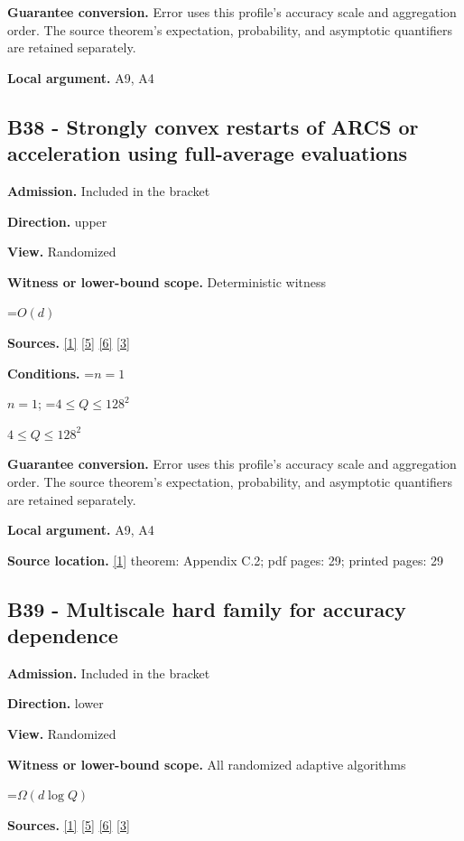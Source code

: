 \documentclass[10pt,a4paper]{article}
\newcommand{\AtlasMath}[1]{\par\begingroup\centering\setbox0=\hbox{$\displaystyle #1$}\ifdim\wd0>1.4\linewidth\typeout{ATLAS WIDE FORMULA: \the\wd0}\fi\ifdim\wd0>\linewidth\resizebox{\linewidth}{!}{\box0}\else\box0\fi\par\endgroup}
\newcommand{\AtlasInlineMath}[1]{\begingroup\setbox0=\hbox{$#1$}\ifdim\wd0>.4\linewidth\endgroup\AtlasMath{#1}\else\endgroup$#1$\fi}
\begin{document}
\textbf{Guarantee conversion.} Error uses this profile's accuracy scale and aggregation order. The source theorem's expectation, probability, and asymptotic quantifiers are retained separately.

\textbf{Local argument.} A9, A4

\subsection{B38 - Strongly convex restarts of ARCS or acceleration using full-average evaluations}
\textbf{Admission.} Included in the bracket

\textbf{Direction.} upper

\textbf{View.} Randomized

\textbf{Witness or lower-bound scope.} Deterministic witness

\AtlasMath{O(d)}
\textbf{Sources.} \href{https://arxiv.org/html/2610.00345v1}{[1]} \href{https://arxiv.org/html/2607.16558v2}{[5]} \href{https://www.mathnet.ru/php/archive.phtml?jrnid=mzm&option_lang=eng&paperid=1697&wshow=paper}{[6]} \href{https://arxiv.org/abs/2109.08858}{[3]}

\textbf{Conditions.} \AtlasInlineMath{n=1}; \AtlasInlineMath{4\le Q\le128^2}

\textbf{Guarantee conversion.} Error uses this profile's accuracy scale and aggregation order. The source theorem's expectation, probability, and asymptotic quantifiers are retained separately.

\textbf{Local argument.} A9, A4

\textbf{Source location.} \href{https://arxiv.org/html/2610.00345v1}{[1]} theorem: Appendix C.2; pdf pages: 29; printed pages: 29

\subsection{B39 - Multiscale hard family for accuracy dependence}
\textbf{Admission.} Included in the bracket

\textbf{Direction.} lower

\textbf{View.} Randomized

\textbf{Witness or lower-bound scope.} All randomized adaptive algorithms

\AtlasMath{\Omega(d\log Q)}
\textbf{Sources.} \href{https://arxiv.org/html/2610.00345v1}{[1]} \href{https://arxiv.org/html/2607.16558v2}{[5]} \href{https://www.mathnet.ru/php/archive.phtml?jrnid=mzm&option_lang=eng&paperid=1697&wshow=paper}{[6]} \href{https://arxiv.org/abs/2109.08858}{[3]}
\end{document}
